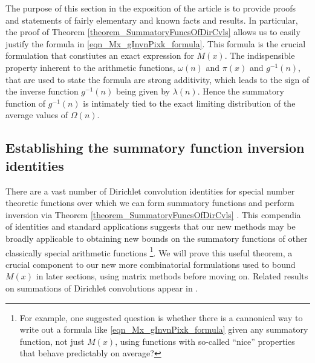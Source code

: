 \documentclass[11pt,reqno,a4letter]{article}
\numberwithin{figure}{section}
\numberwithin{table}{section}
\newcommand{\cf}{\textit{cf.\ }}
\theoremstyle{plain}
\numberwithin{theorem}{section}
\theoremstyle{definition}
\begin{document}
The purpose of this section in the exposition of the article is to provide proofs and statements 
of fairly elementary and known facts and results. In particular, the proof of 
Theorem \ref{theorem_SummatoryFuncsOfDirCvls} allows us to easily justify the formula in 
\eqref{eqn_Mx_gInvnPixk_formula}. 
This formula is the crucial formulation that constiutes an exact expression for $M(x)$. 
The indispensible property inherent to the arithmetic functions, $\omega(n)$ and $\pi(x)$ and $g^{-1}(n)$, 
that are used to state the formula are strong additivity, which leads to the sign of the inverse function 
$g^{-1}(n)$ being given by $\lambda(n)$. Hence the summatory function of $g^{-1}(n)$ is 
intimately tied to the exact limiting 
distribution of the average values of $\Omega(n)$. 

\subsection{Establishing the summatory function inversion identities} 

There are a vast number of Dirichlet convolution 
identities for special number theoretic functions over which 
we can form summatory functions and perform inversion via 
Theorem \ref{theorem_SummatoryFuncsOfDirCvls} \cite{CATALOG-INTDIRSERIES,CATALOG-LAMBERTSERIES}. 
This compendia of identities and standard applications suggests that our new methods may be 
broadly applicable to obtaining new bounds on the summatory functions of other classically special 
arithmetic functions \footnote{ 
     For example, one suggested question is whether there is a cannonical way to write out a 
     formula like \eqref{eqn_Mx_gInvnPixk_formula} 
     given any summatory function, not just $M(x)$, using functions with 
     so-called ``nice'' properties that behave predictably on average? 
}. 
We will prove this useful theorem, a crucial component to our new more combinatorial 
formulations used to bound $M(x)$ in later sections, using matrix methods before moving on. 
Related results on summations of Dirichlet convolutions appear in 
\cite[\S 2.14; \S 3.10; \S 3.12; \cf \S 4.9, p.\ 95]{APOSTOLANUMT}. 
\end{document}
